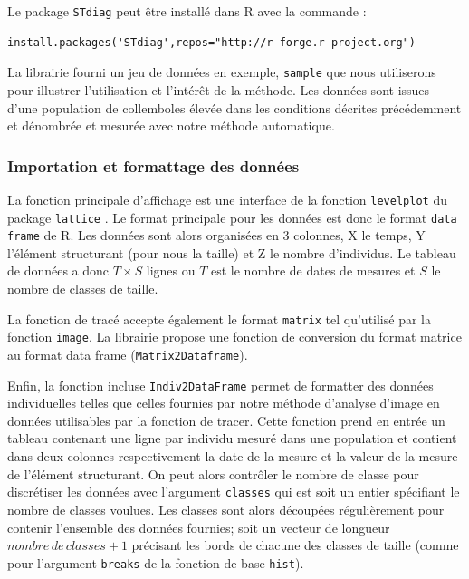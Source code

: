 Le package \texttt{STdiag} peut être installé dans R avec la commande :
\begin{verbatim}
install.packages('STdiag',repos="http://r-forge.r-project.org")
\end{verbatim}

La librairie fourni un jeu de données en exemple, \texttt{sample} que nous
utiliserons pour illustrer l'utilisation et l'intérêt de la méthode. Les données
sont issues d'une population de collemboles élevée dans les conditions décrites
précédemment et dénombrée et mesurée avec notre méthode automatique. 

\subsubsection{Importation et formattage des données}

La fonction principale d'affichage est une interface de la fonction
\texttt{levelplot} du package \texttt{lattice} \autocites{sarkar2008a}. Le
format principale pour les données est donc le format \texttt{data frame} de R.
Les données sont alors organisées en 3 colonnes, X le temps, Y l'élément
structurant (pour nous la taille) et Z le nombre d'individus. Le tableau de
données a donc $T \times S$ lignes ou $T$ est le nombre de dates de mesures et
$S$ le nombre de classes de taille.

La fonction de tracé accepte également le format \texttt{matrix} tel qu'utilisé
par la fonction \texttt{image}. La librairie propose une fonction de
conversion du format matrice au format data frame (\texttt{Matrix2Dataframe}).


Enfin, la fonction incluse \texttt{Indiv2DataFrame} permet de formatter des
données individuelles telles que celles fournies par notre méthode d'analyse
d'image en données utilisables par la fonction de tracer.
Cette fonction prend en entrée un tableau contenant une ligne par individu mesuré dans
une population et contient dans deux colonnes respectivement la date de la
mesure et la valeur de la mesure de l'élément structurant. On peut alors
contrôler le nombre de classe pour discrétiser les données avec l'argument
\texttt{classes} qui est soit un entier spécifiant le nombre de classes voulues.
Les classes sont alors découpées régulièrement pour contenir l'ensemble des
données fournies; soit un vecteur de longueur $nombre\,de\,classes + 1$
précisant les bords de chacune des classes de taille (comme pour l'argument
\texttt{breaks} de la fonction de base \texttt{hist}).


